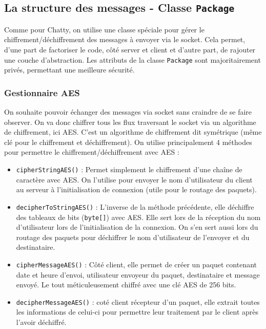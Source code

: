 \documentclass{article}
\begin{document}
\subsection{La structure des messages - Classe \texttt{Package}}

Comme pour Chatty, on utilise une classe spéciale pour gérer le chiffrement/déchiffrement des messages à envoyer via le socket. 
Cela permet, d'une part de factoriser le code, côté server et client et d'autre part, de rajouter une couche d'abstraction. 
Les attributs de la classe \texttt{Package} sont majoritairement privés, permettant une meilleure sécurité. 

\subsubsection{Gestionnaire AES}

On souhaite pouvoir échanger des messages via socket sans craindre de se faire observer. On va donc chiffrer tous les flux 
traversant le socket via un algorithme de chiffrement, ici AES. 
C'est un algorithme de chiffrement dit symétrique (même clé pour le chiffrement et déchiffrement). 
On utilise principalement 4 méthodes pour permettre le chiffrement/déchiffrement avec AES : 
\begin{itemize}
    \item \texttt{cipherStringAES()} : Permet simplement le chiffrement d'une chaîne de caractère avec AES. 
    On l'utilise pour envoyer le nom d'utilisateur du client au serveur à l'initialisation de connexion (utile pour le routage des paquets). 
    \item \texttt{decipherToStringAES()} : L'inverse de la méthode précédente, elle déchiffre des tableaux de bits (\texttt{byte[]}) 
    avec AES. Elle sert lors de la réception du nom d'utilisateur lors de l'initialisation de la connexion.
    On s'en sert aussi lors du routage des paquets pour déchiffrer le nom d'utilisateur de l'envoyer et du destinataire. 
    \item \texttt{cipherMessageAES()} : Côté client, elle permet de créer un paquet contenant date et heure d'envoi, utilisateur 
    envoyeur du paquet, destinataire et message envoyé. Le tout méticuleusement chiffré avec une clé AES de 256 bits. 
    \item \texttt{decipherMessageAES()} : coté client récepteur d'un paquet, elle extrait toutes les informations de celui-ci pour 
    permettre leur traitement par le client après l'avoir déchiffré. 
\end{itemize}
\end{document}

